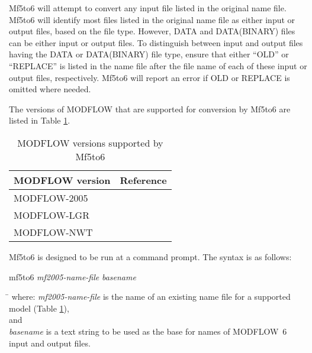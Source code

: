 \documentclass[11pt,twoside,twocolumn]{usgsreport}
\newcommand{\programname}{Mf5to6}
\newcommand{\mfname}{MODFLOW~6}
\begin{document}
\programname{} will attempt to convert any input file listed in the original name file. \programname{} will identify most files listed in the original name file as either input or output files, based on the file type. However, DATA and DATA(BINARY) files can be either input or output files. To distinguish between input and output files having the DATA or DATA(BINARY) file type, ensure that either ``OLD'' or ``REPLACE'' is listed in the name file after the file name of each of these input or output files, respectively. \programname{} will report an error if OLD or REPLACE is omitted where needed.

The versions of MODFLOW that are supported for conversion by \programname{} are listed in Table \ref{tab:suppver}.


\begin{table}[h]
\caption{MODFLOW versions supported by \programname{}}\label{tab:suppver}
\small 
\begin{tabular}{ll}\hline
MODFLOW version & Reference\\
\hline
\hline
MODFLOW-2005 & \cite{modflow2005}\\
MODFLOW-LGR & \cite{mehl2007modflow}\\
MODFLOW-NWT & \cite{modflownwt}\\
\hline
\end{tabular}
\normalsize
\end{table}

\SECTION{Using \programname{}}
%
\programname{} is designed to be run at a command prompt. The syntax is as follows:\\
\vspace{6pt}

mf5to6  \textit{mf2005-name-file}  \textit{basename}

\begin{tabbing}
\hspace*{1.2cm}\= \kill
where: \> \textit{mf2005-name-file} is the name of an existing name file for a supported model (Table \ref{tab:suppver}), \\
 and \\
\>\textit{basename} is a text string to be used as the base for names of \mfname{} input and output files. \\
\end{tabbing}
\end{document}
